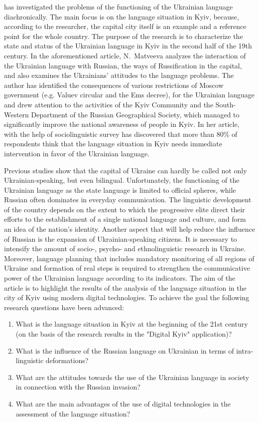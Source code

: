 \documentclass[english]{textolivre}
\begin{document}
\textcite[p.106-113]{matveieva2018language} has investigated the problems of the functioning of the Ukrainian language diachronically. The main focus is on the language situation in Kyiv, because, according to the researcher, the capital city itself is an example and a reference point for the whole country. The purpose of the research is to characterize the state and status of the Ukrainian language in Kyiv in the second half of the 19th century. In the aforementioned article, N. Matveeva analyzes the interaction of the Ukrainian language with Russian, the ways of Russification in the capital, and also examines the Ukrainians' attitudes to the language problems. The author has identified the consequences of various restrictions of Moscow government (e.g. Valuev circular and the Ems decree), for the Ukrainian language and drew attention to the activities of the Kyiv Community and the South-Western Department of the Russian Geographical Society, which managed to significantly improve the national awareness of people in Kyiv. In her article, \textcite[p.3-17]{sokolova2012} with the help of sociolinguistic survey has discovered that more than 80\% of respondents think that the language situation in Kyiv needs immediate intervention in favor of the Ukrainian language.

 Previous studies show that the capital of Ukraine can hardly be called not only Ukrainian-speaking, but even bilingual. Unfortunately, the functioning of the Ukrainian language as the state language is limited to official spheres, while Russian often dominates in everyday communication. The linguistic development of the country depends on the extent to which the progressive elite direct their efforts to the establishment of a single national language and culture, and form an idea of the nation's identity. Another aspect that will help reduce the influence of Russian is the expansion of Ukrainian-speaking citizens. It is necessary to intensify the amount of socio-, psycho- and ethnolinguistic research in Ukraine. Moreover, language planning that includes mandatory monitoring of all regions of Ukraine and formation of real steps is required to strengthen the communicative power of the Ukrainian language according to its indicators. The aim of the article is to highlight the results of the analysis of the language situation in the city of Kyiv using modern digital technologies. To achieve the goal the following research questions have been advanced: 
 
 \begin{enumerate}
 \item What is the language situation in Kyiv at the beginning of the 21st century (on the basis of the research results in the "Digital Kyiv" application)?
 \item What is the influence of the Russian language on Ukrainian in terms of intra-linguistic deformations?
 \item What are the attitudes towards the use of the Ukrainian language in society in connection with the Russian invasion?
 \item What are the main advantages of the use of digital technologies in the assessment of the language situation?
 \end{enumerate}
 
\end{document}
